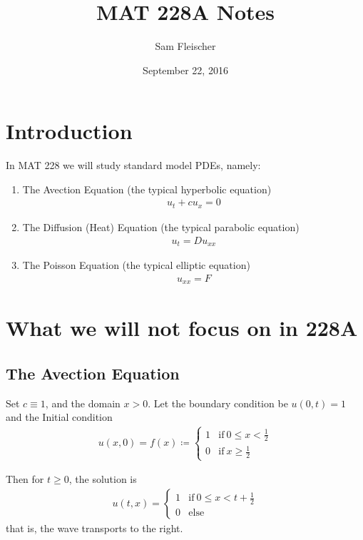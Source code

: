 \documentclass{article}
\title{MAT 228A Notes}
\author{Sam Fleischer}
\date{September 22, 2016}
\begin{document}
    \maketitle

    \section{Introduction}

        In MAT 228 we will study standard model PDEs, namely:
        \begin{enumerate}
            \item The Avection Equation (the typical hyperbolic equation)
            \begin{align}
                u_t + c u_x = 0
            \end{align}
            \item The Diffusion (Heat) Equation (the typical parabolic equation)
            \begin{align}
                u_t = D u_{xx}
            \end{align}
            \item The Poisson Equation (the typical elliptic equation)
            \begin{align}
                u_{xx} = F
            \end{align}
        \end{enumerate}

    \section{What we will not focus on in 228A}
        \subsection{The Avection Equation}

            Set $c \equiv 1$, and the domain $x > 0$.  Let the boundary condition be $u(0, t) = 1$ and the Initial condition
            \begin{align}
                u(x,0) = f(x) \coloneqq \begin{cases}
                    1 & \text{if}\ 0 \leq x < \frac{1}{2} \\ 0 & \text{if}\ x \geq \frac{1}{2}
                \end{cases}
            \end{align}

            Then for $t \geq 0$, the solution is
            \begin{align*}
                u(t,x) = \begin{cases}
                    1 & \text{if}\ 0 \leq x < t + \frac{1}{2} \\
                    0 & \text{else}
                \end{cases}
            \end{align*}
            that is, the wave transports to the right.
\end{document}
